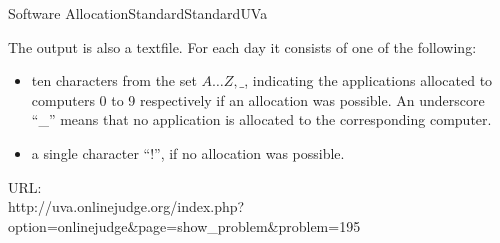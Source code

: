 \begin{problema}{Software Allocation}{Standard}{Standard}{UVa}
\OutputFile

The output is also a textfile. For each day it consists of one of the following: 

\begin{itemize}
\item ten characters from the set $A \dots Z , \_ $, indicating the applications allocated to computers 0 to 9 respectively if an allocation was possible. An underscore ``\_'' means that no application is allocated to the corresponding computer.

\item a single character ``!'', if no allocation was possible. 
\end{itemize}


\Example




URL:\\ 
http://uva.onlinejudge.org/index.php? \\
option=onlinejudge\&page=show\_problem\&problem=195

\end{problema}
